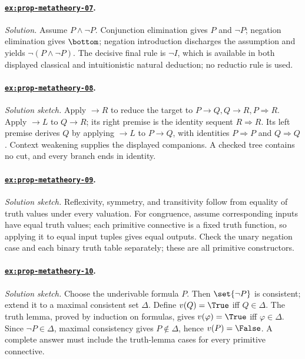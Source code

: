 \paragraph{\hyperref[ex:prop-metatheory-07]{\texttt{ex:prop-metatheory-07}}.}
\textit{Solution.}  Assume \(P\land\neg P\).  Conjunction elimination gives
\(P\) and \(\neg P\); negation elimination gives \(\bottom\); negation
introduction discharges the assumption and yields \(\neg(P\land\neg P)\).
The decisive final rule is \(\neg I\), which is available in both displayed
classical and intuitionistic natural deduction; no reductio rule is used.

\paragraph{\hyperref[ex:prop-metatheory-08]{\texttt{ex:prop-metatheory-08}}.}
\textit{Solution sketch.}  Apply \(\to R\) to reduce the target to
\(P\to Q,Q\to R,P\Rightarrow R\).  Apply \(\to L\) to \(Q\to R\); its right
premise is the identity sequent \(R\Rightarrow R\).  Its left premise derives
\(Q\) by applying \(\to L\) to \(P\to Q\), with identities
\(P\Rightarrow P\) and \(Q\Rightarrow Q\).  Context weakening supplies the
displayed companions.  A checked tree contains no cut, and every branch ends in
identity.

\paragraph{\hyperref[ex:prop-metatheory-09]{\texttt{ex:prop-metatheory-09}}.}
\textit{Solution sketch.}  Reflexivity, symmetry, and transitivity follow from
equality of truth values under every valuation.  For congruence, assume
corresponding inputs have equal truth values; each primitive connective is a
fixed truth function, so applying it to equal input tuples gives equal outputs.
Check the unary negation case and each binary truth table separately; these are
all primitive constructors.

\paragraph{\hyperref[ex:prop-metatheory-10]{\texttt{ex:prop-metatheory-10}}.}
\textit{Solution sketch.}  Choose the underivable formula \(P\).  Then
\(\set{\neg P}\) is consistent; extend it to a maximal consistent set
\(\Delta\).  Define \(v(Q)=\True\) iff \(Q\in\Delta\).  The truth
lemma, proved by induction on formulas, gives
\(v(\varphi)=\True\) iff \(\varphi\in\Delta\).  Since \(\neg P\in\Delta\),
maximal consistency gives \(P\notin\Delta\), hence \(v(P)=\False\).  A complete
answer must include the truth-lemma cases for every primitive connective.

